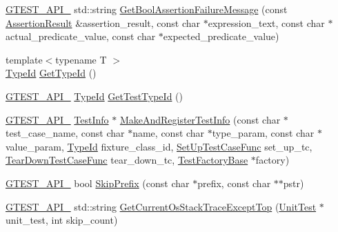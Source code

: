 \begin{DoxyCompactItemize}
\item 
\hyperlink{gtest-port_8h_aa73be6f0ba4a7456180a94904ce17790}{G\+T\+E\+S\+T\+\_\+\+A\+P\+I\+\_\+} std\+::string \hyperlink{namespacetesting_1_1internal_aed8d3ad4341f8f2de53440e39c995632}{Get\+Bool\+Assertion\+Failure\+Message} (const \hyperlink{classtesting_1_1_assertion_result}{Assertion\+Result} \&assertion\+\_\+result, const char $\ast$expression\+\_\+text, const char $\ast$actual\+\_\+predicate\+\_\+value, const char $\ast$expected\+\_\+predicate\+\_\+value)
\item 
{\footnotesize template$<$typename T $>$ }\\\hyperlink{namespacetesting_1_1internal_ab1114197d3c657d8b7f8e0c5caa12d00}{Type\+Id} \hyperlink{namespacetesting_1_1internal_a6b108e56fdc68ea937ffb3759fb55ab0}{Get\+Type\+Id} ()
\item 
\hyperlink{gtest-port_8h_aa73be6f0ba4a7456180a94904ce17790}{G\+T\+E\+S\+T\+\_\+\+A\+P\+I\+\_\+} \hyperlink{namespacetesting_1_1internal_ab1114197d3c657d8b7f8e0c5caa12d00}{Type\+Id} \hyperlink{namespacetesting_1_1internal_a1e85cf16bb95b60f879d48ba1fbfc1c9}{Get\+Test\+Type\+Id} ()
\item 
\hyperlink{gtest-port_8h_aa73be6f0ba4a7456180a94904ce17790}{G\+T\+E\+S\+T\+\_\+\+A\+P\+I\+\_\+} \hyperlink{classtesting_1_1_test_info}{Test\+Info} $\ast$ \hyperlink{namespacetesting_1_1internal_a7e37d3160f9d17529d3521c93e245dba}{Make\+And\+Register\+Test\+Info} (const char $\ast$test\+\_\+case\+\_\+name, const char $\ast$name, const char $\ast$type\+\_\+param, const char $\ast$value\+\_\+param, \hyperlink{namespacetesting_1_1internal_ab1114197d3c657d8b7f8e0c5caa12d00}{Type\+Id} fixture\+\_\+class\+\_\+id, \hyperlink{namespacetesting_1_1internal_ada14d66b5460b20e09071f51b9885c8d}{Set\+Up\+Test\+Case\+Func} set\+\_\+up\+\_\+tc, \hyperlink{namespacetesting_1_1internal_aad40244621b68546f3b830696225bf9b}{Tear\+Down\+Test\+Case\+Func} tear\+\_\+down\+\_\+tc, \hyperlink{classtesting_1_1internal_1_1_test_factory_base}{Test\+Factory\+Base} $\ast$factory)
\item 
\hyperlink{gtest-port_8h_aa73be6f0ba4a7456180a94904ce17790}{G\+T\+E\+S\+T\+\_\+\+A\+P\+I\+\_\+} bool \hyperlink{namespacetesting_1_1internal_aac72b20299ad4a99554ce161e1769560}{Skip\+Prefix} (const char $\ast$prefix, const char $\ast$$\ast$pstr)
\item 
\hyperlink{gtest-port_8h_aa73be6f0ba4a7456180a94904ce17790}{G\+T\+E\+S\+T\+\_\+\+A\+P\+I\+\_\+} std\+::string \hyperlink{namespacetesting_1_1internal_ae7ae495d3207e26968dfbd537c5e6dee}{Get\+Current\+Os\+Stack\+Trace\+Except\+Top} (\hyperlink{classtesting_1_1_unit_test}{Unit\+Test} $\ast$unit\+\_\+test, int skip\+\_\+count)
$$
\end{DoxyCompactItemize}
